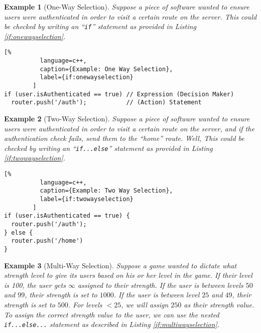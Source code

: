\documentclass[12pt]{report}
\theoremstyle{definition}
\theoremstyle{plain}
\theoremstyle{plain}
\newtheorem*{examp*}{Example}
\begin{document}
        \begin{examp*}[One-Way Selection]
          Suppose a piece of software wanted to ensure users were authenticated
            in order to visit a certain route on the server. This could be
            checked by writing an ``\texttt{if}'' statement as provided in
            Listing \ref{if:onewayselection}.
        \end{examp*}

        \begin{lstlisting}[%
          language=c++,
          caption={Example: One Way Selection},
          label={if:onewayselection}
        ]
if (user.isAuthenticated == true) // Expression (Decision Maker)
  router.push('/auth');           // (Action) Statement
        \end{lstlisting}

        \begin{examp*}[Two-Way Selection]
          Suppose a piece of software wanted to ensure users were authenticated
            in order to visit a certain route on the server, and \emph{if the
            authentication check fails}, send them to the ``home'' route. Well,
            This could be checked by writing an ``\texttt{if...else}'' statement
            as provided in Listing \ref{if:twowayselection}.
        \end{examp*}

        \begin{lstlisting}[%
          language=c++,
          caption={Example: Two Way Selection},
          label={if:twowayselection}
        ]
if (user.isAuthenticated == true) {
  router.push('/auth');
} else {
  router.push('/home')
}
        \end{lstlisting}

        \begin{examp*}[Multi-Way Selection]
          Suppose a game wanted to dictate what strength level to give its users
            based on his or her level in the game. If their level is 100, the
            user gets $\infty$ assigned to their strength. If the user is
            between levels $50$ and $99$, their strength is set to $1000$. If
            the user is between level $25$ and $49$, their strength is set to
            $500$. For levels $<25$, we will assign $250$ as their strength
            value. To assign the correct strength value to the user, we can use
            the \textit{nested} \texttt{if...else...} statement as described in
            Listing \ref{if:multiwayselection}.
        \end{examp*}
\end{document}
